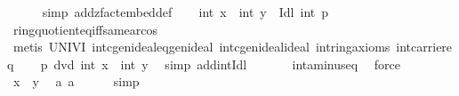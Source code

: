 \begin{isabellebody}
\ \ \ \ \isamarkupfalse%
\ {\isacharparenleft}{\kern0pt}simp\ add{\isacharcolon}{\kern0pt}zfact{\isacharunderscore}{\kern0pt}embed{\isacharunderscore}{\kern0pt}def{\isacharparenright}{\kern0pt}\isanewline
\ \ \isamarkupfalse%
\ {\isachardoublequoteopen}int\ x\ {\isasymominus}\isactrlbsub {\isasymZ}\isactrlesub \ int\ y\ {\isasymin}\ Idl\isactrlbsub {\isasymZ}\isactrlesub \ {\isacharbraceleft}{\kern0pt}int\ p{\isacharbraceright}{\kern0pt}{\isachardoublequoteclose}\isanewline
\ \ \ \ \isamarkupfalse%
\ ring{\isachardot}{\kern0pt}quotient{\isacharunderscore}{\kern0pt}eq{\isacharunderscore}{\kern0pt}iff{\isacharunderscore}{\kern0pt}same{\isacharunderscore}{\kern0pt}a{\isacharunderscore}{\kern0pt}r{\isacharunderscore}{\kern0pt}cos\ \isanewline
\ \ \ \ \isamarkupfalse%
\ {\isacharparenleft}{\kern0pt}metis\ UNIV{\isacharunderscore}{\kern0pt}I\ int{\isachardot}{\kern0pt}cgenideal{\isacharunderscore}{\kern0pt}eq{\isacharunderscore}{\kern0pt}genideal\ int{\isachardot}{\kern0pt}cgenideal{\isacharunderscore}{\kern0pt}ideal\ int{\isachardot}{\kern0pt}ring{\isacharunderscore}{\kern0pt}axioms\ int{\isacharunderscore}{\kern0pt}carrier{\isacharunderscore}{\kern0pt}eq{\isacharparenright}{\kern0pt}\isanewline
\ \ \isamarkupfalse%
\ {\isachardoublequoteopen}p\ dvd\ {\isacharparenleft}{\kern0pt}int\ x\ {\isacharminus}{\kern0pt}\ int\ y{\isacharparenright}{\kern0pt}{\isachardoublequoteclose}\ \isamarkupfalse%
\ {\isacharparenleft}{\kern0pt}simp\ add{\isacharcolon}{\kern0pt}int{\isacharunderscore}{\kern0pt}Idl{\isacharparenright}{\kern0pt}\ \isanewline
\ \ \ \ \isamarkupfalse%
\ int{\isacharunderscore}{\kern0pt}a{\isacharunderscore}{\kern0pt}minus{\isacharunderscore}{\kern0pt}eq\ \isamarkupfalse%
\ force\isanewline
\ \ \isamarkupfalse%
\ {\isachardoublequoteopen}x\ {\isacharequal}{\kern0pt}\ y{\isachardoublequoteclose}\ \isamarkupfalse%
\ a{}\ a{}\isanewline
\ \ \ \ \isamarkupfalse%
\ {\isacharparenleft}{\kern0pt}simp{\isacharparenright}{\kern0pt}\ \isanewline
\ \ \ \ \isamarkupfalse%

\end{isabellebody}
